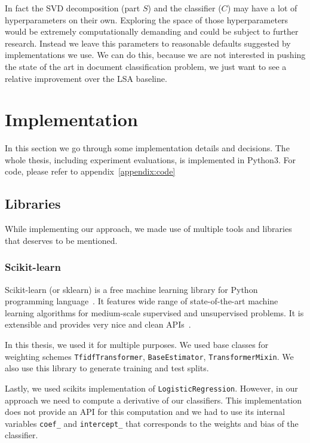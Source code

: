     In fact the SVD decomposition (part $S$) and the classifier ($C$) may have a lot of hyperparameters on their own.
    Exploring the space of those hyperparameters would be extremely computationally demanding and could be subject to further research.
    Instead we leave this parameters to reasonable defaults suggested by implementations we use.
    We can do this, because we are not interested in pushing the state of the art in document classification problem, we just want to see a relative improvement over the LSA baseline.


\section{Implementation}
    
    In this section we go through some implementation details and decisions.
    The whole thesis, including experiment evaluations, is implemented in Python3.
    For code, please refer to appendix~\ref{appendix:code}

    \subsection{Libraries} 

    While implementing our approach, we made use of multiple tools and libraries that deserves to be mentioned.

    \subsubsection{Scikit-learn}
    
    Scikit-learn (or sklearn) is a free machine learning library for Python programming language~\cite{scikit-learn}.
    It features wide range of state-of-the-art machine learning algorithms for medium-scale supervised and unsupervised problems.
    It is extensible and provides very nice and clean APIs~\cite{sklearn_api}.
    
    In this thesis, we used it for multiple purposes.
    We used base classes for weighting schemes \texttt{TfidfTransformer}, \texttt{BaseEstimator}, \texttt{TransformerMixin}.
    We also use this library to generate training and test splits. 
    
    Lastly, we used scikits implementation of \texttt{LogisticRegression}.
    However, in our approach we need to compute a derivative of our classifiers. 
    This implementation does not provide an API for this computation and we had to use
    its internal variables \texttt{coef\_} and \texttt{intercept\_} that corresponds to the weights and bias of the classifier.
    
